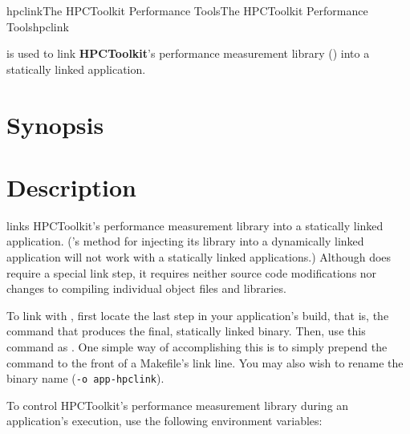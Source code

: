 \documentclass[english]{article}
\begin{document}
\begin{Name}{1}{hpclink}{The HPCToolkit Performance Tools}{The HPCToolkit Performance Tools}{hpclink}

 is used to link \textbf{HPCToolkit}'s performance measurement library () into a  statically linked application.

\end{Name}

\section{Synopsis}

  

\section{Description}

 links HPCToolkit's performance measurement library into a statically linked application.
('s method for injecting its library into a dynamically linked application will not work with a statically linked applications.)
Although  does require a special link step, it requires neither source code modifications nor changes to compiling individual object files and libraries.

To link with , first locate the last step in your application's build, that is, the command that produces the final, statically linked binary.
Then, use this command as .
One simple way of accomplishing this is to simply prepend the  command to the front of a Makefile's link line.
You may also wish to rename the binary name (\texttt{-o app-hpclink}).

To control HPCToolkit's performance measurement library during an application's execution, use the following environment variables:
\end{document}
